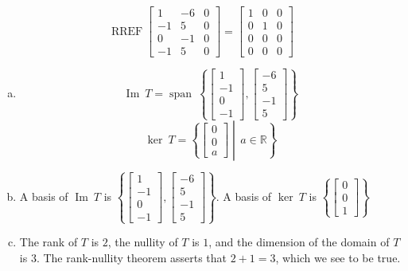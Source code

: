 \begin{exerciseAnswer} 


\[\operatorname{RREF} \left[\begin{array}{ccc}
1 & -6 & 0 \\
-1 & 5 & 0 \\
0 & -1 & 0 \\
-1 & 5 & 0
\end{array}\right] = \left[\begin{array}{ccc}
1 & 0 & 0 \\
0 & 1 & 0 \\
0 & 0 & 0 \\
0 & 0 & 0
\end{array}\right] \]


\begin{enumerate}[(a)]
\item \[\operatorname{Im}\ T = \operatorname{span}\  \left\{ \left[\begin{array}{c}
1 \\
-1 \\
0 \\
-1
\end{array}\right] , \left[\begin{array}{c}
-6 \\
5 \\
-1 \\
5
\end{array}\right] \right\} \]\[\operatorname{ker}\ T =  \left\{ \left[\begin{array}{c}
0 \\
0 \\
a
\end{array}\right] \middle|\,a\in\mathbb{R}\right\} \]
\item  A basis of \(\operatorname{Im}\ T\) is \( \left\{ \left[\begin{array}{c}
1 \\
-1 \\
0 \\
-1
\end{array}\right] , \left[\begin{array}{c}
-6 \\
5 \\
-1 \\
5
\end{array}\right] \right\} \). A basis of \(\operatorname{ker}\ T\) is \( \left\{ \left[\begin{array}{c}
0 \\
0 \\
1
\end{array}\right] \right\} \)
\item  The rank of \(T\) is \( 2 \), the nullity of \(T\) is \( 1 \), and the dimension of the domain of \(T\) is \( 3 \). The rank-nullity theorem asserts that \( 2 + 1 = 3 \), which we see to be true. 
\end{enumerate}
    
\end{exerciseAnswer}
    

